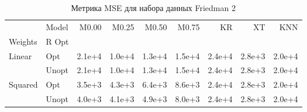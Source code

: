 \begin{table}
\caption{Метрика MSE для набора данных Friedman 2}
\label{tab:MSE_Friedman 2}
\begin{tabular}{llrrrrrrr}
\toprule
 & Model & M0.00 & M0.25 & M0.50 & M0.75 & KR & XT & KNN \\
Weights & R Opt &  &  &  &  &  &  &  \\
\midrule
\multirow[t]{2}{*}{Linear} & Opt & 2.1e+4 & 1.0e+4 & 1.3e+4 & 1.5e+4 & 2.4e+4 & 2.8e+3 & 2.0e+4 \\
 & Unopt & 2.1e+4 & 1.0e+4 & 1.3e+4 & 1.5e+4 & 2.4e+4 & 2.8e+3 & 2.0e+4 \\

\multirow[t]{2}{*}{Squared} & Opt & 3.5e+3 & 4.3e+3 & 6.4e+3 & 8.6e+3 & 2.4e+4 & 2.8e+3 & 2.0e+4 \\
 & Unopt & 4.0e+3 & 4.1e+3 & 4.9e+3 & 8.0e+3 & 2.4e+4 & 2.8e+3 & 2.0e+4 \\

\bottomrule
\end{tabular}
\end{table}
